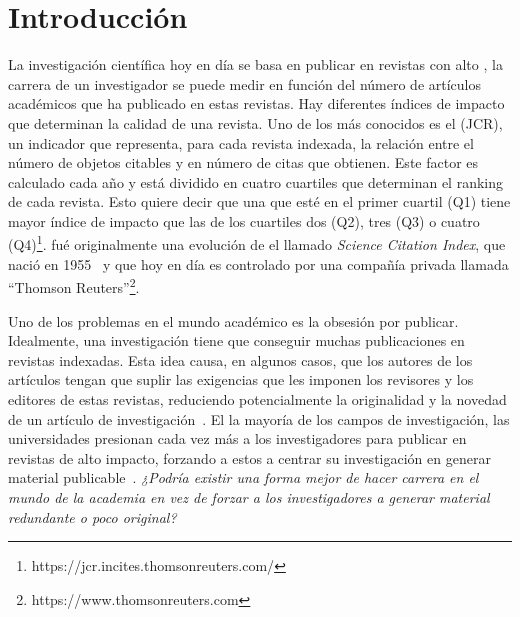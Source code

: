 \section{Introducción}

La investigación científica hoy en día se basa en publicar en revistas con alto
 \cite{doi:10.1001/jama.295.1.90}, la carrera de un
investigador se puede medir en función del número de artículos académicos que ha
publicado en estas revistas. Hay diferentes índices de impacto que determinan
la calidad de una revista. Uno de los más conocidos es el  (JCR), un indicador que representa, para cada revista indexada, la
relación entre el número de objetos citables y en número de citas que obtienen.
Este factor es calculado cada año y está dividido en cuatro cuartiles que
determinan el ranking de cada revista. Esto quiere decir que una que esté
en el primer cuartil (Q1) tiene mayor índice de impacto que las de los
cuartiles dos (Q2), tres (Q3) o cuatro
(Q4)\footnote{https://jcr.incites.thomsonreuters.com/}.  fué
originalmente una evolución de el llamado \emph{Science Citation Index}, que
nació en 1955~\cite{garfield2007evolution} y que hoy en día es controlado por
una compañía privada llamada ``Thomson
Reuters''\footnote{https://www.thomsonreuters.com}. 

Uno de los problemas en el mundo académico es la obsesión por publicar.
Idealmente, una investigación tiene que conseguir muchas publicaciones en
revistas indexadas. Esta idea causa, en algunos casos, que los autores de los
artículos tengan que suplir las exigencias que les imponen los revisores y los
editores de estas revistas, reduciendo potencialmente la originalidad y la
novedad de un artículo de investigación~\cite{Frey2003}. El la mayoría de los
campos de investigación, las
universidades presionan cada vez más a los investigadores para publicar en
revistas de alto impacto, forzando a estos a centrar su investigación en generar
material publicable~\cite{ortinau2011writing}. \emph{ ¿Podría existir una forma
  mejor de hacer carrera en el mundo de la academia en vez de forzar a los
  investigadores a generar material redundante o poco original?}


